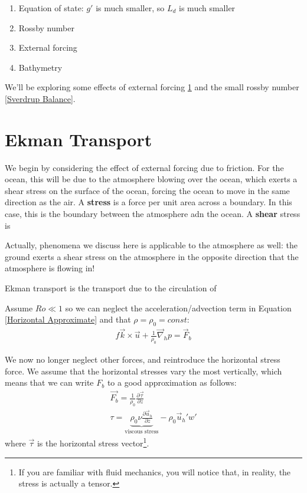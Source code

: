 \begin{enumerate}
    \item Equation of state: $g'$ is much smaller, so $L_d$ is much smaller
    \item Rossby number
    \item External forcing
    \item Bathymetry
\end{enumerate}

We'll be exploring some effects of external forcing \ref{Ekman Transport} and the small rossby number \ref{Sverdrup Balance}.

\section{Ekman Transport}\label{Ekman Transport}

We begin by considering the effect of external forcing due to friction. For the ocean, this will be due to the atmosphere blowing over the ocean, which exerts a shear stress on the surface of the ocean, forcing the ocean to move in the same direction as the air. A \textbf{stress} is a force per unit area across a boundary. In this case, this is the boundary between the atmosphere adn the ocean. A \textbf{shear} stress is 

Actually, phenomena we discuss here is applicable to the atmosphere as well: the ground exerts a shear stress on the atmosphere in the opposite direction that the atmosphere is flowing in!

Ekman transport is the transport due to the circulation of 

Assume $Ro\ll1$ so we can neglect the acceleration/advection term in Equation \ref{Horizontal Approximate} and that $\rho=\rho_0=const$:
\begin{align*}
    f\vec{k}\times\vec{u}+\frac{1}{\rho_0}\vec{\nabla}_h p = \vec{F}_b
\end{align*}

We now no longer neglect other forces, and reintroduce the horizontal stress force. We assume that the horizontal stresses vary the most vertically, which means that we can write $F_b$ to a good approximation as follows:
\begin{align*}
    \vec{F_b} = \frac{1}{\rho_0}\frac{\partial \vec{\tau}}{\partial z}\\
    \tau=\underbrace{\rho_0\nu\frac{\partial \vec{u}_h}{\partial z}}_{\text{viscous stress}}-
    \rho_0 \vec{u}_h'w'
\end{align*}
where $\vec{\tau}$ is the horizontal stress vector\footnote{If you are familiar with fluid mechanics, you will notice that, in reality, the stress is actually a tensor.}. 

